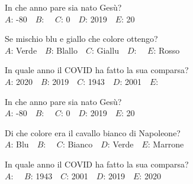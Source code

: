 \mcquestionfooter



\def\mcquestionnumber{10}


\mcquestionheader In che anno pare sia nato Gesù?\\
{$A$}: -80\ \ {$B$}: \ \ {$C$}: 0\ \ {$D$}: 2019\ \ {$E$}: 20\ \ 

\mcquestionfooter



\def\mcquestionnumber{11}


\mcquestionheader Se mischio blu e giallo che colore ottengo?\\
{$A$}: Verde\ \ {$B$}: Blallo\ \ {$C$}: Giallu\ \ {$D$}: \ \ {$E$}: Rosso\ \ 

\mcquestionfooter



\def\mcquestionnumber{12}


\mcquestionheader In quale anno il COVID ha fatto la sua comparsa?\\
{$A$}: 2020\ \ {$B$}: 2019\ \ {$C$}: 1943\ \ {$D$}: 2001\ \ {$E$}: \ \ 

\mcquestionfooter



\mcpaperfooter

\def\mcserialnumber{28}
\mcpaperheader


\def\mcquestionnumber{1}


\mcquestionheader In che anno pare sia nato Gesù?\\
{$A$}: -80\ \ {$B$}: \ \ {$C$}: 0\ \ {$D$}: 2019\ \ {$E$}: 20\ \ 

\mcquestionfooter



\def\mcquestionnumber{2}


\mcquestionheader Di che colore era il cavallo bianco di Napoleone?\\
{$A$}: Blu\ \ {$B$}: \ \ {$C$}: Bianco\ \ {$D$}: Verde\ \ {$E$}: Marrone\ \ 

\mcquestionfooter



\def\mcquestionnumber{3}


\mcquestionheader In quale anno il COVID ha fatto la sua comparsa?\\
{$A$}: \ \ {$B$}: 1943\ \ {$C$}: 2001\ \ {$D$}: 2019\ \ {$E$}: 2020\ \ 

\mcquestionfooter



\def\mcquestionnumber{4}


